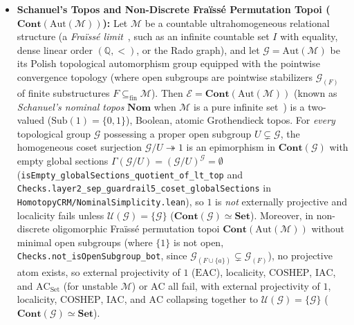 \documentclass[10pt,twoside,openright]{book}
\theoremstyle{crmplain}
\theoremstyle{crmdef}
\theoremstyle{crmremark}
\begin{document}
\begin{itemize}[leftmargin=1.5em]
  \item \textbf{Schanuel's Topos and Non-Discrete Fraïssé Permutation Topoi ($\mathbf{Cont}(\mathrm{Aut}(\mathcal{M}))$):} Let $\mathcal{M}$ be a countable ultrahomogeneous relational structure (a \emph{Fraïssé limit}~\cite[\S 7.1]{Hodges93}, such as an infinite countable set $I$ with equality, dense linear order $(\mathbb{Q}, <)$, or the Rado graph), and let $\mathcal{G} = \mathrm{Aut}(\mathcal{M})$ be its Polish topological automorphism group equipped with the pointwise convergence topology (where open subgroups are pointwise stabilizers $\mathcal{G}_{(F)}$ of finite substructures $F \subseteq_{\mathrm{fin}} \mathcal{M}$). Then $\mathcal{E} = \mathbf{Cont}(\mathrm{Aut}(\mathcal{M}))$ (known as \emph{Schanuel's nominal topos} $\mathbf{Nom}$ when $\mathcal{M}$ is a pure infinite set~\cite[Ch.~III, \S 9]{MacLaneMoerdijk92}) is a two-valued ($\mathrm{Sub}(1) = \{0, 1\}$), Boolean, atomic Grothendieck topos. For \emph{every} topological group $\mathcal{G}$ possessing a proper open subgroup $U \subsetneq \mathcal{G}$, the homogeneous coset surjection $\mathcal{G}/U \twoheadrightarrow 1$ is an epimorphism in $\mathbf{Cont}(\mathcal{G})$ with empty global sections $\Gamma(\mathcal{G}/U) = (\mathcal{G}/U)^{\mathcal{G}} = \emptyset$ (\texttt{isEmpty\_\allowbreak globalSections\_\allowbreak quotient\_\allowbreak of\_\allowbreak lt\_\allowbreak top} and \texttt{Checks.\allowbreak layer2\_\allowbreak sep\_\allowbreak guardrail5\_\allowbreak coset\_\allowbreak globalSections} in \texttt{HomotopyCRM/\allowbreak NominalSimplicity.lean}), so $1$ is \emph{not} externally projective and localicity fails unless $\mathcal{U}(\mathcal{G}) = \{\mathcal{G}\}$ ($\mathbf{Cont}(\mathcal{G}) \simeq \mathbf{Set}$). Moreover, in non-discrete oligomorphic Fraïssé permutation topoi $\mathbf{Cont}(\mathrm{Aut}(\mathcal{M}))$ without minimal open subgroups (where $\{1\}$ is not open, \texttt{Checks.not\_isOpenSubgroup\_bot}, since $\mathcal{G}_{(F \cup \{a\})} \subsetneq \mathcal{G}_{(F)}$), no projective atom exists, so external projectivity of $1$ ($\mathrm{EAC}$), localicity, $\mathrm{COSHEP}$, $\mathrm{IAC}$, and $\mathrm{AC}_{\mathrm{Set}}$ (for unstable $\mathcal{M}$) or $\mathrm{AC}$ all fail, with external projectivity of $1$, localicity, $\mathrm{COSHEP}$, $\mathrm{IAC}$, and $\mathrm{AC}$ collapsing together to $\mathcal{U}(\mathcal{G}) = \{\mathcal{G}\}$ ($\mathbf{Cont}(\mathcal{G}) \simeq \mathbf{Set}$).

\end{itemize}
\end{document}
